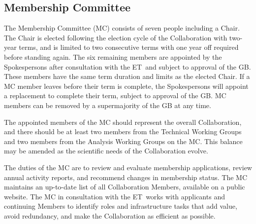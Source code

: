 \documentclass[12pt]{article}
\newcommand{\Comment}[1]{\textcolor{Blue}{(Comment: #1)}}
\newcommand{\exec}{{Executive Team}}
\newcommand{\shorte}{{ET}}  %
\begin{document}
\subsection{Membership Committee}

The Membership Committee (MC) consists of seven people including a Chair. The Chair is elected following the election cycle of the Collaboration with  two-year terms, and is limited to two consecutive terms with one year off required before standing again. The six remaining members are appointed by the Spokespersons after consultation with the \shorte\ and subject to approval of the GB. %
These members have the same term duration and limits as the elected Chair. If a MC member leaves before their term is complete, the Spokespersons 
will appoint a replacement to complete their term, subject to approval of the GB.   MC members can be removed by a supermajority of the GB at any time.  


The appointed members of the MC should represent the overall Collaboration, and there should be at least two members from the Technical Working Groups and two members from the Analysis Working Groups on the MC.  This balance may be amended as the scientific needs of the Collaboration evolve. %

The duties of the MC  are to review and evaluate membership applications, review annual activity reports, and recommend changes in membership status. The MC maintains an up-to-date list of all Collaboration Members, available on a public website.  The MC in consultation with the \shorte\ works with applicants and continuing Members to identify roles and infrastructure tasks that add value, avoid redundancy, and make the Collaboration as efficient as possible.  
\end{document}
